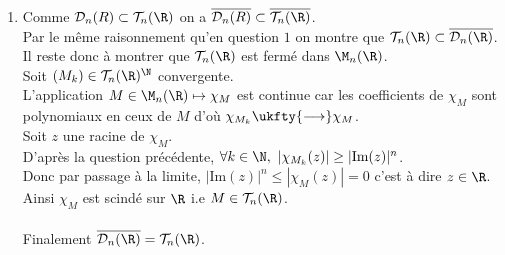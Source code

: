\documentclass{book}
\begin{document}
\begin{enumerate}[leftmargin=*]
\begin{enumerate}[label=\alph*.]
			Donc, $|P(z)|=\displaystyle\prod\limits_{k=1}^d|z-x_k|\geq \prod\limits_{k=1}^d|\text{Im}(z)|=|\text{Im}(z)|^d$\\
			Réciproquement si $\forall z\in \C,\ |P(z)|\geq |\text{Im}(z)|^d$ alors pour toute racine $z$ de $P$ on a $|\text{Im}(z)|^d\leq 0$ d'où $\text{Im}(z)=0$ c'est à dire $z\in \R$.\\
			On sait que $P$ est scindé sur $\C$ et donc $P$ est scindé sur $\R$.
			\item Comme $\mathcal{D}_n(R)\subset \mathcal{T}_n(\R)$ on a $\overline{\mathcal{D}_n(R)}\subset \overline{\mathcal{T}_n(\R)}$.\\
			Par le même raisonnement qu'en question $1$ on montre que $\mathcal{T}_n(\R)\subset \overline{\mathcal{D}_n(\R)}$.\\
			Il reste donc à montrer que $\mathcal{T}_n(\R)$ est fermé dans $\M_n(\R)$.\\
			Soit $(M_k)\in \mathcal{T}_n(\R)^\N$ convergente.\\
			L'application $M\in \M_n(\R)\mapsto \chi_M$ est continue car les coefficients de $\chi_M$ sont polynomiaux en ceux de $M$ d'où $\chi_{M_k}\ukfty{\longrightarrow}\chi_M$.\\
			Soit $z$ une racine de $\chi_M$.\\
			D'après la question précédente, $\forall k\in \N,\ |\chi_{M_k}(z)|\geq |\text{Im}(z)|^n$.\\
			Donc par passage à la limite, $|\text{Im}(z)|^n\leq |\chi_M(z)|=0$ c'est à dire $z\in \R$.\\
			Ainsi $\chi_M$ est scindé sur $\R$ i.e $M\in \mathcal{T}_n(\R)$.\\\\
			Finalement $\overline{\mathcal{D}_n(\R)}=\mathcal{T}_n(\R)$.
		\end{enumerate}
	\end{enumerate}
	
\end{document}
